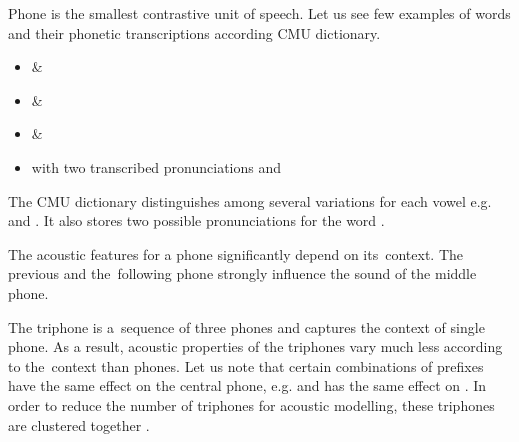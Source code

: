 {
Phone is the smallest contrastive unit of speech. 
Let us see few examples of words and their phonetic transcriptions according CMU dictionary\cite{weide1998cmu}.
\begin{itemize}
    \item {} \& 
    \item {} \& 
    \item {} \& 
    \item {} with two transcribed pronunciations  and 
\end{itemize}
The CMU dictionary distinguishes among several variations for each vowel e.g.  and .
It also stores two possible pronunciations for the word .

The acoustic features for a phone significantly depend on its~context.
The previous and the~following phone strongly influence the sound of the middle phone.

The triphone is a~sequence of three phones and captures the context of single phone.
As a result, acoustic properties of the triphones vary much less according to the~context than phones.
Let us note that certain combinations of prefixes have the same effect on the central phone,
e.g.  and  has the same effect on . %
In order to reduce the number of triphones for acoustic modelling, these triphones are clustered together .



%     
%     

}
